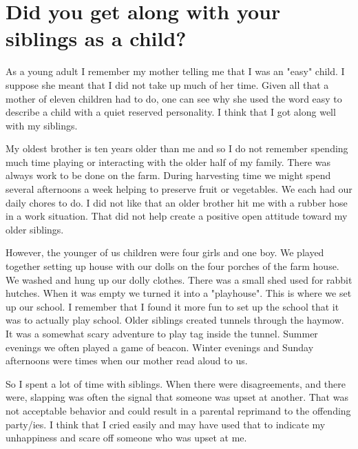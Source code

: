 \section{Did you get along with your siblings as a child?}
As a young adult I remember my mother telling me that I was an "easy" child.
I suppose she meant that I did not take up much of her time.
Given all that a mother of eleven children had to do, one can see why she used the word easy to describe a child with a quiet reserved personality.
I think that I got along well with my siblings.

My oldest brother is ten years older than me and so I do not remember spending much time playing or interacting with the older half of my family.
There was always work to be done on the farm.
During harvesting time we might spend several afternoons a week helping to preserve fruit or vegetables.
We each had our daily chores to do.
I did not like that an older brother hit me with a rubber hose in a work situation.
That did not help create a positive open attitude toward my older siblings.

However, the younger of us children were four girls and one boy.
We played together setting up house with our dolls on the four porches of the farm house.
We washed and hung up our dolly clothes.
There was a small shed used for rabbit hutches.
When it was empty we turned it into a "playhouse".
This is where we set up our school.
I remember that I found it more fun to set up the school that it was to actually play school.
Older siblings created tunnels through the haymow.
It was a somewhat scary adventure to play tag inside the tunnel.
Summer evenings we often played a game of beacon.
Winter evenings and Sunday afternoons were times when our mother read aloud to us.

So I spent a lot of time with siblings.
When there were disagreements, and there were, slapping was often the signal that someone was upset at another.
That was not acceptable behavior and could result in a parental reprimand to the offending party/ies.
I think that I cried easily and may have used that to indicate my unhappiness and scare off someone who was upset at me.
